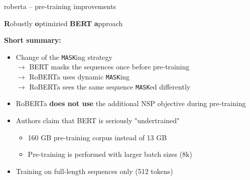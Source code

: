 \begin{frame}{roberta -- pre-training improvements}

\vfill

\textbf{R}obustly \textbf{o}ptimizied \textbf{BERT} \textbf{a}pproach \\ \medskip\medskip

\textbf{Short summary:}

	\begin{itemize}
		\item Change of the \texttt{MASK}ing strategy  \\
					$\to$ BERT masks the sequences once before pre-training  \\
					$\to$ RoBERTa uses dynamic \texttt{MASK}ing  \\
					$\to$ RoBERTa sees the same sequence \texttt{MASK}ed differently
		\item RoBERTa \textbf{does not use} the additional NSP objective during pre-training
		\item Authors claim that BERT is seriously "undertrained"
			\begin{itemize}
				\item 160 GB pre-training corpus instead of 13 GB
				\item Pre-training is performed with larger batch sizes (8k)
			\end{itemize}
		\item Training on full-length sequences only (512 tokens)
	\end{itemize}
	
\vfill

\end{frame}

